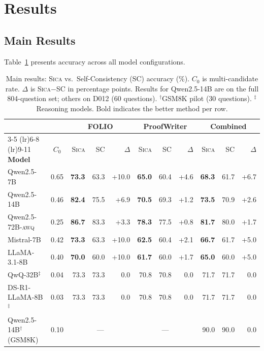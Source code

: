 \documentclass[11pt,a4paper]{article}
\newcommand{\sica}{\textsc{Sica}}
\newcommand{\czero}{C_0}
\begin{document}
\section{Results}
\label{sec:results}

\subsection{Main Results}
\label{sec:main-results}

Table~\ref{tab:main} presents accuracy across all model configurations.

\begin{table}[t]
\centering
\caption{Main results: \sica{} vs.\ Self-Consistency (SC) accuracy (\%). $\czero{}$ is multi-candidate rate. $\Delta$ is \sica{}$-$SC in percentage points. Results for Qwen2.5-14B are on the full 804-question set; others on D012 (60 questions). $^\dagger$GSM8K pilot (30 questions). $^\ddagger$Reasoning models. Bold indicates the better method per row.}
\label{tab:main}
\small
\begin{tabular}{@{}l c rrr rrr rrr@{}}
\toprule
& & \multicolumn{3}{c}{\textbf{FOLIO}} & \multicolumn{3}{c}{\textbf{ProofWriter}} & \multicolumn{3}{c}{\textbf{Combined}} \\
\cmidrule(lr){3-5} \cmidrule(lr){6-8} \cmidrule(lr){9-11}
\textbf{Model} & $\czero{}$ & \sica{} & SC & $\Delta$ & \sica{} & SC & $\Delta$ & \sica{} & SC & $\Delta$ \\
\midrule
Qwen2.5-7B   & 0.65 & \textbf{73.3} & 63.3 & +10.0 & \textbf{65.0} & 60.4 & +4.6 & \textbf{68.3} & 61.7 & +6.7 \\
Qwen2.5-14B  & 0.46 & \textbf{82.4} & 75.5 & +6.9  & \textbf{70.5} & 69.3 & +1.2 & \textbf{73.5} & 70.9 & +2.6 \\
Qwen2.5-72B\textsc{-awq} & 0.25 & \textbf{86.7} & 83.3 & +3.3  & \textbf{78.3} & 77.5 & +0.8 & \textbf{81.7} & 80.0 & +1.7 \\
Mistral-7B   & 0.42 & \textbf{73.3} & 63.3 & +10.0 & \textbf{62.5} & 60.4 & +2.1 & \textbf{66.7} & 61.7 & +5.0 \\
LLaMA-3.1-8B & 0.40 & \textbf{70.0} & 60.0 & +10.0 & \textbf{61.7} & 60.0 & +1.7 & \textbf{65.0} & 60.0 & +5.0 \\
\midrule
QwQ-32B$^\ddagger$       & 0.04 & 73.3 & 73.3 & 0.0  & 70.8 & 70.8 & 0.0  & 71.7 & 71.7 & 0.0 \\
DS-R1-LLaMA-8B$^\ddagger$ & 0.03 & 73.3 & 73.3 & 0.0  & 70.8 & 70.8 & 0.0  & 71.7 & 71.7 & 0.0 \\
\midrule
Qwen2.5-14B$^\dagger$ (GSM8K) & 0.10 & \multicolumn{3}{c}{---} & \multicolumn{3}{c}{---} & 90.0 & 90.0 & 0.0 \\
\bottomrule
\end{tabular}
\end{table}
\end{document}
